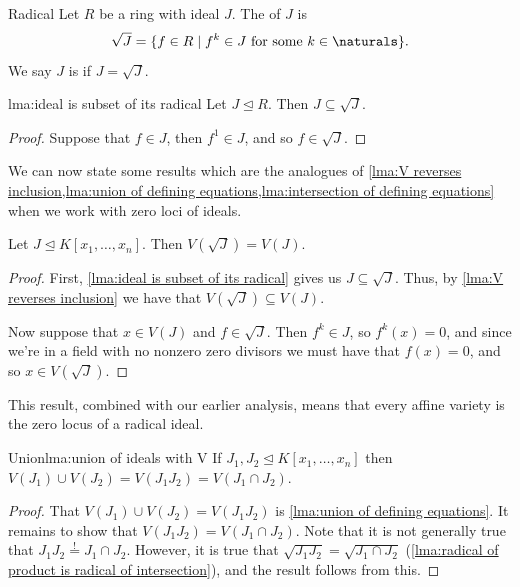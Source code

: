\documentclass[fleqn]{NotesClass}
\newcommand{\subideal}{\trianglelefteq}
\begin{document}
    \begin{dfn}{Radical}{}
        Let \(R\) be a ring with ideal \(J\).
        The  of \(J\) is
        \begin{equation}
            \sqrt{J} = \{f \in R \mid f^k \in J \text{ for some } k \in \naturals\}.
        \end{equation}
        We say \(J\) is  if \(J = \sqrt{J}\).
    \end{dfn}
    
    \begin{lma}{}{lma:ideal is subset of its radical}
        Let \(J \subideal R\).
        Then \(J \subseteq \sqrt{J}\).
        \begin{proof}
            Suppose that \(f \in J\), then \(f^1 \in J\), and so \(f \in \sqrt{J}\).
        \end{proof}
    \end{lma}
    
    We can now state some results which are the analogues of \cref{lma:V reverses inclusion,lma:union of defining equations,lma:intersection of defining equations} when we work with zero loci of ideals.
    
    \begin{lma}{}{}
        Let \(J \subideal K[x_1, \dotsc, x_n]\).
        Then \(V(\sqrt{J}) = V(J)\).
        \begin{proof}
            First, \cref{lma:ideal is subset of its radical} gives us \(J \subseteq \sqrt{J}\).
            Thus, by \cref{lma:V reverses inclusion} we have that \(V(\sqrt{J}) \subseteq V(J)\).
            
            Now suppose that \(x \in V(J)\) and \(f \in \sqrt{J}\).
            Then \(f^k \in J\), so \(f^k(x) = 0\), and since we're in a field with no nonzero zero divisors we must have that \(f(x) = 0\), and so \(x \in V(\sqrt{J})\).
        \end{proof}
    \end{lma}
    
    This result, combined with our earlier analysis, means that every affine variety is the zero locus of a radical ideal.
    
    \begin{lma}{Union}{lma:union of ideals with V}
        If \(J_1, J_2 \subideal K[x_1, \dotsc, x_n]\) then \(V(J_1) \cup V(J_2) = V(J_1 J_2) = V(J_1 \cap J_2)\).
        \begin{proof}
            That \(V(J_1) \cup V(J_2) = V(J_1 J_2)\) is \cref{lma:union of defining equations}.
            It remains to show that \(V(J_1 J_2) = V(J_1 \cap J_2)\).
            Note that it is not generally true that \(J_1 J_2 \stackrel{!}{=} J_1 \cap J_2\).
            However, it is true that \(\sqrt{J_1J_2} = \sqrt{J_1 \cap J_2}\) (\cref{lma:radical of product is radical of intersection}), and the result follows from this.
        \end{proof}
    \end{lma}
    
\end{document}
